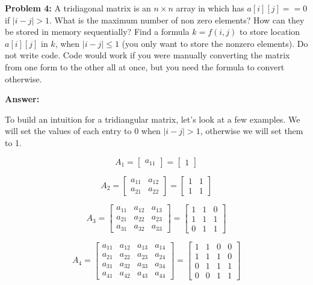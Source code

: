 \documentclass[12pt,letterpaper,final]{report}
\begin{document}
\bigskip
\noindent\textbf{Problem 4:}  A tridiagonal matrix is an $n \times n$ array in which has $a[i][j] == 0$ if $|i-j| > 1$. What is the maximum number of non zero elements? How can they be stored in memory sequentially? Find a formula $k = f(i,j)$ to store location $a[i][j]$ in $k$, when $|i-j| \le 1$ (you only want to store the nonzero elements). Do not write code. Code would work if you were manually converting the matrix from one form to the other all at once, but you need the formula to convert otherwise.

\noindent\textbf{Answer:}

To build an intuition for a tridiangular matrix, let's look at a few examples. We will set the values of each entry to 0 when $|i - j| > 1$, otherwise we will set them to 1.

\[
  A_1 =
  \begin{bmatrix}
    a_{11}
  \end{bmatrix}
  =
  \begin{bmatrix}
    1
  \end{bmatrix}
\]

\[
  A_2 =
  \begin{bmatrix}
    a_{11} & a_{12} \\
    a_{21} & a_{22}
  \end{bmatrix}
  =
  \begin{bmatrix}
    1 & 1 \\
    1 & 1
  \end{bmatrix}
\]

\[
  A_3 =
  \begin{bmatrix}
    a_{11} & a_{12} & a_{13} \\
    a_{21} & a_{22} & a_{23} \\
    a_{31} & a_{32} & a_{33}
  \end{bmatrix}
  =
  \begin{bmatrix}
    1 & 1 & 0 \\
    1 & 1 & 1 \\
    0 & 1 & 1
  \end{bmatrix}
\]

\[
  A_4 =
  \begin{bmatrix}
    a_{11} & a_{12} & a_{13} & a_{14} \\
    a_{21} & a_{22} & a_{23} & a_{24} \\
    a_{31} & a_{32} & a_{33} & a_{34} \\
    a_{41} & a_{42} & a_{43} & a_{44}
  \end{bmatrix}
  =
  \begin{bmatrix}
    1 & 1 & 0 & 0 \\
    1 & 1 & 1 & 0 \\
    0 & 1 & 1 & 1 \\
    0 & 0 & 1 & 1
  \end{bmatrix}
\]
\end{document}

